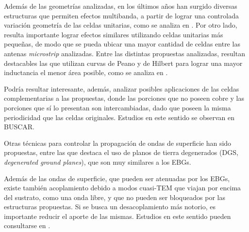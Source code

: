Además de las geometrías analizadas, en los últimos años han surgido diversas estructuras que permiten efectos multibanda, a partir de lograr una controlada variación geometría de las celdas unitarias, como se analiza en \cite{Kern:multiband}. Por otro lado, resulta importante lograr efectos similares utilizando celdas unitarias más pequeñas, de modo que se pueda ubicar una mayor cantidad de celdas entre las antenas \textit{microstrip} analizadas. Entre las distintas propuestas analizadas, resultan destacables las que utilizan curvas de Peano y de Hilbert para lograr una mayor inductancia el menor área posible, como se analiza en \cite{McVay:Hilbert}.

Podría resultar interesante, además, analizar posibles aplicaciones de las celdas complementarias a las propuestas, donde las porciones que no poseen cobre y las porciones que sí lo presentan son intercambiadas, dado que poseen la misma periodicidad que las celdas originales. Estudios en este sentido se observan en BUSCAR.

Otras técnicas para controlar la propagación de ondas de superficie han sido propuestas, entre las que destaca el uso de planos de tierra degenerados (DGS, \textit{degenerated ground planes}), que son muy similares a los EBGs.

Además de las ondas de superficie, que pueden ser atenuadas por los EBGs, existe también acoplamiento debido a modos cuasi-TEM que viajan por encima del sustrato, como una onda libre, y que no pueden ser bloqueados por las estructuras propuestas. Si se busca un desacoplamiento más notorio, es importante reducir el aporte de las mismas. Estudios en este sentido pueden consultarse en \cite{Asimonis:designoptimization}.


